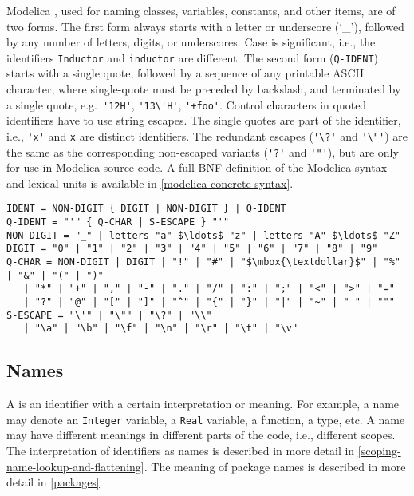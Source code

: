 Modelica , used for naming classes, variables, constants, and other items, are of two forms.
The first form always starts with a letter or underscore (`\_'), followed by any number of letters, digits, or underscores.
Case is significant, i.e., the identifiers \lstinline!Inductor! and \lstinline!inductor! are different.
The second form (\lstinline[language=grammar]!Q-IDENT!) starts with a single quote, followed by a sequence of any printable ASCII character, where single-quote must be preceded by backslash, and terminated by a single quote, e.g.\ \lstinline!'12H'!, \lstinline!'13\'H'!, \lstinline!'+foo'!.
Control characters in quoted identifiers have to use string escapes.
The single quotes are part of the identifier, i.e., \lstinline!'x'! and \lstinline!x! are distinct identifiers.
The redundant escapes (\lstinline!'\?'! and \lstinline!'\"'!) are the same as the corresponding non-escaped variants (\lstinline!'?'! and \lstinline!'"'!), but are only for use in Modelica source code.
A full BNF definition of the Modelica syntax and lexical units is available in \cref{modelica-concrete-syntax}.

\begin{lstlisting}[language=grammar]
IDENT = NON-DIGIT { DIGIT | NON-DIGIT } | Q-IDENT
Q-IDENT = "'" { Q-CHAR | S-ESCAPE } "'"
NON-DIGIT = "_" | letters "a" $\ldots$ "z" | letters "A" $\ldots$ "Z"
DIGIT = "0" | "1" | "2" | "3" | "4" | "5" | "6" | "7" | "8" | "9"
Q-CHAR = NON-DIGIT | DIGIT | "!" | "#" | "$\mbox{\textdollar}$" | "%" | "&" | "(" | ")"
   | "*" | "+" | "," | "-" | "." | "/" | ":" | ";" | "<" | ">" | "="
   | "?" | "@" | "[" | "]" | "^" | "{" | "}" | "|" | "~" | " " | """
S-ESCAPE = "\'" | "\"" | "\?" | "\\"
   | "\a" | "\b" | "\f" | "\n" | "\r" | "\t" | "\v"
\end{lstlisting}

\subsection{Names}\label{names}

A  is an identifier with a certain interpretation or meaning.
For example, a name may denote an \lstinline!Integer! variable, a \lstinline!Real! variable, a function, a type, etc.
A name may have different meanings in different parts of the code, i.e., different scopes.
The interpretation of identifiers as names is described in more detail in \cref{scoping-name-lookup-and-flattening}.
The meaning of package names is described in more detail in \cref{packages}.

